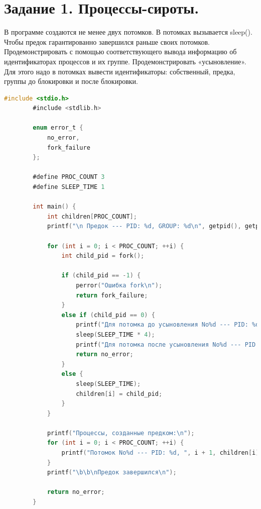 \documentclass[12pt]{report}
\begin{document}
    
    
    \section*{Задание 1. Процессы-сироты.}
    В программе создаются не менее двух потомков.
    В потомках вызывается sleep().
    Чтобы предок гарантированно завершился раньше своих потомков.
    Продемонстрировать с помощью соответствующего вывода информацию об идентификаторах процессов и их группе.
    Продемонстрировать «усыновление».
    Для этого надо в потомках вывести идентификаторы:
    собственный, предка, группы до блокировки и после блокировки.
    
    \begin{lstlisting}[label=code:fork, caption=Процессы-сироты, language=C]
    	#include <stdio.h>
    	#include <stdlib.h>
    	
    	enum error_t {
    		no_error,
    		fork_failure
    	};
    	
    	#define PROC_COUNT 3
    	#define SLEEP_TIME 1
    	
    	int main() {
    		int children[PROC_COUNT];
    		printf("\n Предок --- PID: %d, GROUP: %d\n", getpid(), getpgrp());
    		
    		for (int i = 0; i < PROC_COUNT; ++i) {
    			int child_pid = fork();
    			
    			if (child_pid == -1) {
    				perror("Ошибка fork\n");
    				return fork_failure;
    			}
    			else if (child_pid == 0) {
    				printf("Для потомка до усыновления No%d --- PID: %d, PPID: %d, GROUP: %d\n", i + 1, getpid(), getppid(), getpgrp());
    				sleep(SLEEP_TIME * 4);
    				printf("Для потомка после усыновления No%d --- PID: %d, PPID: %d, GROUP: %d\n", i + 1, getpid(), getppid(), getpgrp());
    				return no_error;
    			}
    			else {
    				sleep(SLEEP_TIME);
    				children[i] = child_pid;
    			}
    		}
    		
    		printf("Процессы, созданные предком:\n");
    		for (int i = 0; i < PROC_COUNT; ++i) {
    			printf("Потомок No%d --- PID: %d, ", i + 1, children[i]);
    		}
    		printf("\b\b\nПредок завершился\n");
    		
    		return no_error;
    	}
    \end{lstlisting}
\end{document}
